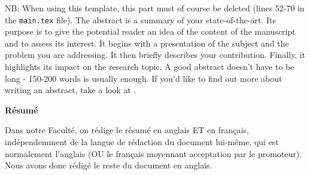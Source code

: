 \documentclass[a4paper]{scrartcl}
\begin{document}
NB: When using this template, this part must of course be deleted (lines 52-70 in the \texttt{main.tex} file).
\vskip1cm
The abstract is a summary of your state-of-the-art. Its purpose is to give the potential reader an idea of the content of the manuscript and to assess its interest. It begins with a presentation of the subject and the problem you are addressing. It then briefly describes your contribution. Finally, it highlights its impact on the research topic. A good abstract doesn't have to be long - 150-200 words is usually enough. If you'd like to find out more about writing an abstract, take a look at \cite{abstract}.
\vskip1cm
\begin{center}
	\textbf{Résumé}
\end{center}
Dans notre Faculté, on rédige le résumé en anglais ET en français, indépendemment de la langue de rédaction du document lui-même, qui est normalement l'anglais (OU le français moyennant acceptation par le promoteur). Nous avons donc rédigé le reste du document en anglais.


\newpage

\tableofcontents

\newpage




\appendix


\end{document}
